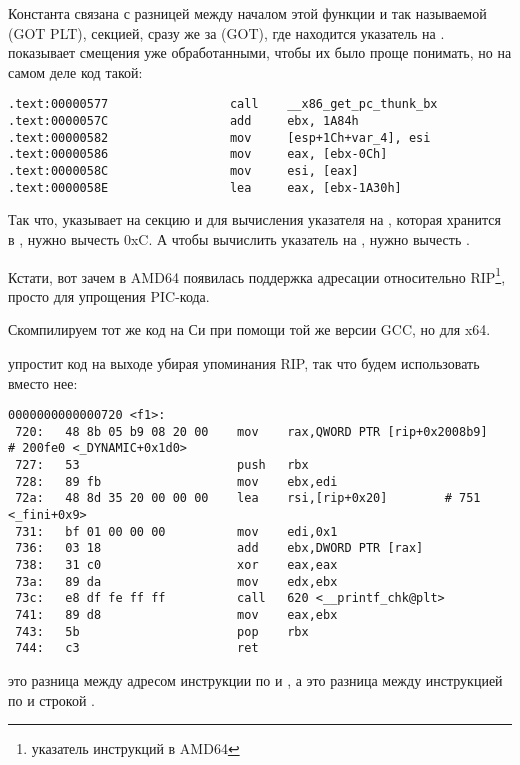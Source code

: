 Константа  связана с разницей между началом этой функции и так называемой
 (GOT PLT), секцией, сразу же за  (GOT), где находится указатель на \globvar{}.
\IDA показывает смещения уже обработанными, чтобы их было проще понимать, но на самом деле код такой:

\begin{lstlisting}
.text:00000577                 call    __x86_get_pc_thunk_bx
.text:0000057C                 add     ebx, 1A84h
.text:00000582                 mov     [esp+1Ch+var_4], esi
.text:00000586                 mov     eax, [ebx-0Ch]
.text:0000058C                 mov     esi, [eax]
.text:0000058E                 lea     eax, [ebx-1A30h]
\end{lstlisting}

Так что, \EBX указывает на секцию  и для вычисления указателя на \globvar{}, которая хранится в , нужно вычесть 0xC.
А чтобы вычислить указатель на \retstring{}, нужно вычесть .

Кстати, вот зачем в AMD64 появилась поддержка адресации относительно RIP\footnote{указатель инструкций в AMD64}, просто для упрощения PIC-кода.

Скомпилируем тот же код на Си при помощи той же версии GCC, но для x64.

\IDA упростит код на выходе убирая упоминания RIP, так что будем использовать  вместо нее:

\begin{lstlisting}
0000000000000720 <f1>:
 720:	48 8b 05 b9 08 20 00 	mov    rax,QWORD PTR [rip+0x2008b9]        # 200fe0 <_DYNAMIC+0x1d0>
 727:	53                   	push   rbx
 728:	89 fb                	mov    ebx,edi
 72a:	48 8d 35 20 00 00 00 	lea    rsi,[rip+0x20]        # 751 <_fini+0x9>
 731:	bf 01 00 00 00       	mov    edi,0x1
 736:	03 18                	add    ebx,DWORD PTR [rax]
 738:	31 c0                	xor    eax,eax
 73a:	89 da                	mov    edx,ebx
 73c:	e8 df fe ff ff       	call   620 <__printf_chk@plt>
 741:	89 d8                	mov    eax,ebx
 743:	5b                   	pop    rbx
 744:	c3                   	ret    
\end{lstlisting}

 это разница между адресом инструкции по  и \globvar{}, 
а  это разница между инструкцией по  и строкой \retstring{}.

